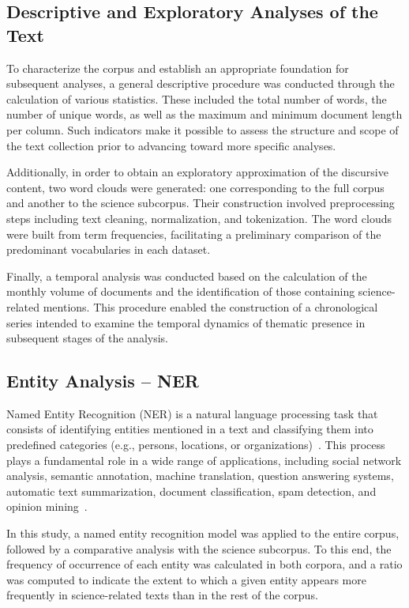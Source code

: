 \documentclass[pdflatex,sn-mathphys-num, iicol]{sn-jnl}
\begin{document}
	
	
	\subsection{Descriptive and Exploratory Analyses of the Text}\label{subsec:descriptive}
	
	To characterize the corpus and establish an appropriate foundation for subsequent analyses, a general descriptive procedure was conducted through the calculation of various statistics. These included the total number of words, the number of unique words, as well as the maximum and minimum document length per column. Such indicators make it possible to assess the structure and scope of the text collection prior to advancing toward more specific analyses.
	
	Additionally, in order to obtain an exploratory approximation of the discursive content, two word clouds were generated: one corresponding to the full corpus and another to the science subcorpus. Their construction involved preprocessing steps including text cleaning, normalization, and tokenization. The word clouds were built from term frequencies, facilitating a preliminary comparison of the predominant vocabularies in each dataset.
	
	Finally, a temporal analysis was conducted based on the calculation of the monthly volume of documents and the identification of those containing science-related mentions. This procedure enabled the construction of a chronological series intended to examine the temporal dynamics of thematic presence in subsequent stages of the analysis.
	
	\subsection{Entity Analysis -- NER}\label{subsec:ner}
	
	Named Entity Recognition (NER) is a natural language processing task that consists of identifying entities mentioned in a text and classifying them into predefined categories (e.g., persons, locations, or organizations)~\cite{Jehangir2023}. This process plays a fundamental role in a wide range of applications, including social network analysis, semantic annotation, machine translation, question answering systems, automatic text summarization, document classification, spam detection, and opinion mining~\cite{Jehangir2023}.
	
	In this study, a named entity recognition model was applied to the entire corpus, followed by a comparative analysis with the science subcorpus. To this end, the frequency of occurrence of each entity was calculated in both corpora, and a ratio was computed to indicate the extent to which a given entity appears more frequently in science-related texts than in the rest of the corpus.
	
\end{document}
